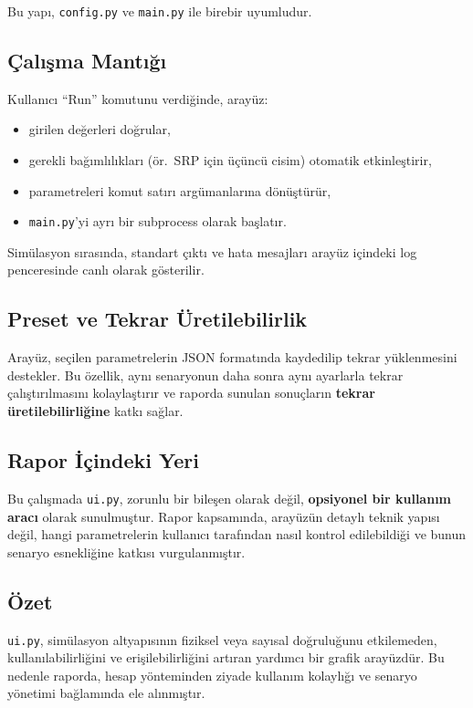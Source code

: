Bu yapı, \texttt{config.py} ve \texttt{main.py} ile birebir uyumludur.

\subsection*{Çalışma Mantığı}
Kullanıcı “Run” komutunu verdiğinde,
arayüz:
\begin{itemize}
  \item girilen değerleri doğrular,
  \item gerekli bağımlılıkları (ör.\ SRP için üçüncü cisim) otomatik etkinleştirir,
  \item parametreleri komut satırı argümanlarına dönüştürür,
  \item \texttt{main.py}’yi ayrı bir subprocess olarak başlatır.
\end{itemize}

Simülasyon sırasında,
standart çıktı ve hata mesajları
arayüz içindeki log penceresinde canlı olarak gösterilir.

\subsection*{Preset ve Tekrar Üretilebilirlik}
Arayüz, seçilen parametrelerin
JSON formatında kaydedilip tekrar yüklenmesini destekler.
Bu özellik,
aynı senaryonun daha sonra
aynı ayarlarla tekrar çalıştırılmasını kolaylaştırır
ve raporda sunulan sonuçların
\textbf{tekrar üretilebilirliğine} katkı sağlar.

\subsection*{Rapor İçindeki Yeri}
Bu çalışmada \texttt{ui.py},
zorunlu bir bileşen olarak değil,
\textbf{opsiyonel bir kullanım aracı} olarak sunulmuştur.
Rapor kapsamında,
arayüzün detaylı teknik yapısı değil,
hangi parametrelerin kullanıcı tarafından nasıl kontrol edilebildiği
ve bunun senaryo esnekliğine katkısı vurgulanmıştır.

\subsection*{Özet}
\texttt{ui.py}, simülasyon altyapısının fiziksel veya sayısal doğruluğunu etkilemeden, kullanılabilirliğini ve erişilebilirliğini artıran yardımcı bir grafik arayüzdür. Bu nedenle raporda, hesap yönteminden ziyade kullanım kolaylığı ve senaryo yönetimi bağlamında ele alınmıştır.

